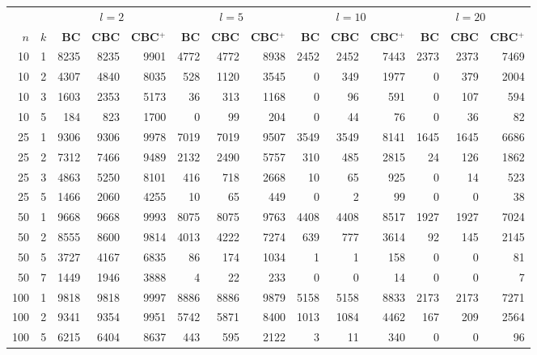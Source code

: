 
\begin{table}
  \begin{center}
  \scriptsize
  \begin{tabular}{|rr | rrr| rrr| rrr| rrr|}
  \hline
   &&\multicolumn{3}{c|}{$l=2$} &\multicolumn{3}{c|}{$l=5$} &\multicolumn{3}{c|}{$l=10$} &\multicolumn{3}{c|}{$l=20$}\\
   \bfseries $n$ & \bfseries $k$
& \bfseries BC & \bfseries CBC & \bfseries CBC$^+$
& \bfseries BC & \bfseries CBC & \bfseries CBC$^+$
& \bfseries BC & \bfseries CBC & \bfseries CBC$^+$
& \bfseries BC & \bfseries CBC & \bfseries CBC$^+$
\\\hline
10&1&
8235&8235&9901&4772&4772&8938&2452&2452&7443&2373&2373&7469\\
10&2&
\cellcolor[gray]{0.85}4307&\cellcolor[gray]{0.85}4840&8035&      \cellcolor[gray]{0.85}528&\cellcolor[gray]{0.85}1120&3545&    0& 349&1977&      0&379&2004\\
10&3&
\cellcolor[gray]{0.85}1603&\cellcolor[gray]{0.85}2353&5173&36&313&1168&0&96&591&0&107&594\\
10&5&
\cellcolor[gray]{0.85}184&\cellcolor[gray]{0.85}823&1700&0&99&204&0&44&76&0&36&82\\
\hline
25&1&
9306&9306&9978&7019&7019&9507&3549&3549&8141&1645&1645&6686\\
25&2&
7312&7466&9489&       2132&2490&5757&        310&485&2815&            24&126&1862\\
25&3&
4863&5250&8101&416&718&2668&10&65&925&0&14&523\\
25&5&
\cellcolor[gray]{0.85}1466&\cellcolor[gray]{0.85}2060&4255&10&65&449&0&2&99&0&0&38\\
\hline
50&1&
9668&9668&9993&8075&8075&9763&4408&4408&8517&1927&1927&7024\\
50&2&
8555&8600&9814&                    4013&4222&7274&          639&777&3614&          92&145&2145\\
50&5&
\cellcolor[gray]{0.85}3727&\cellcolor[gray]{0.85}4167&6835&           86&174&1034&         1&1&158&           0&0&81\\
50&7&
\cellcolor[gray]{0.85}1449&\cellcolor[gray]{0.85}1946&3888&          4&22&233&     0&0&14&             0&0&7\\
\hline
100&1&
9818&9818&9997&8886&8886&9879&5158&5158&8833&2173&2173&7271\\
100&2&
9341&9354&9951&5742&5871&8400&1013&1084&4462&167&209&2564\\
100&5&
6215&6404&8637&443&595&2122&3&11&340&0&0&96\\

\end{tabular}
\end{center}
\end{table}
